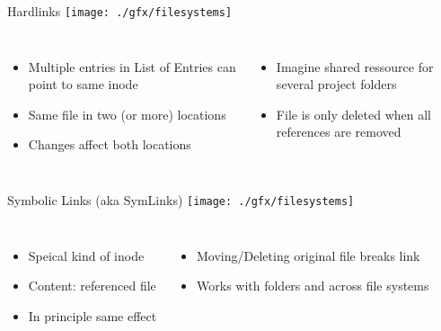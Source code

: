 
\begin{frame}{Hardlinks}
%
\texttt{[image: ./gfx/filesystems]}
%
\begin{columns}
	\begin{itemize}
	\item Multiple entries in List of Entries can point to same inode
	\item[\Thus] Same file in two (or more) locations
	\item Changes affect both locations
	\end{itemize}
%
	\begin{itemize}
	\item Imagine shared ressource for several project folders
	\item File is only deleted when all references are removed
	\end{itemize}
\end{columns}
%
\end{frame}


\begin{frame}{Symbolic Links (aka SymLinks)}
%
\texttt{[image: ./gfx/filesystems]}
%
\begin{columns}
	\begin{itemize}
	\item Speical kind of inode
	\item Content: referenced file
	\item In principle same effect
	\end{itemize}
%
	\begin{itemize}
	\item Moving/Deleting original file breaks link
	\item Works with folders and across file systems
	\end{itemize}
\end{columns}
%
\end{frame}


